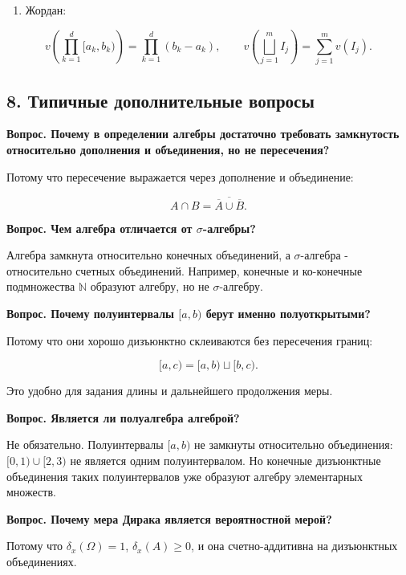 \documentclass[
  11pt,
  a4paper,
]{article}
\providecommand{\tightlist}{%
  \setlength{\itemsep}{0pt}\setlength{\parskip}{0pt}}
\begin{document}
\begin{enumerate}
\def\labelenumi{\arabic{enumi}.}
\setcounter{enumi}{4}
\tightlist
\item
  Жордан:
\end{enumerate}

\[
v\left(\prod_{k=1}^d[a_k,b_k)\right)=\prod_{k=1}^d(b_k-a_k),\qquad
v\left(\bigsqcup_{j=1}^m I_j\right)=\sum_{j=1}^m v(I_j).
\]

\subsection{8. Типичные дополнительные
вопросы}\label{ux442ux438ux43fux438ux447ux43dux44bux435-ux434ux43eux43fux43eux43bux43dux438ux442ux435ux43bux44cux43dux44bux435-ux432ux43eux43fux440ux43eux441ux44b}

\textbf{Вопрос. Почему в определении алгебры достаточно требовать
замкнутость относительно дополнения и объединения, но не пересечения?}

Потому что пересечение выражается через дополнение и объединение:

\[
A\cap B=\overline{\overline{A}\cup \overline{B}}.
\]

\textbf{Вопрос. Чем алгебра отличается от \(\sigma\)-алгебры?}

Алгебра замкнута относительно конечных объединений, а \(\sigma\)-алгебра
- относительно счетных объединений. Например, конечные и ко-конечные
подмножества \(\mathbb N\) образуют алгебру, но не \(\sigma\)-алгебру.

\textbf{Вопрос. Почему полуинтервалы \([a,b)\) берут именно
полуоткрытыми?}

Потому что они хорошо дизъюнктно склеиваются без пересечения границ:

\[
[a,c)=[a,b)\sqcup[b,c).
\]

Это удобно для задания длины и дальнейшего продолжения меры.

\textbf{Вопрос. Является ли полуалгебра алгеброй?}

Не обязательно. Полуинтервалы \([a,b)\) не замкнуты относительно
объединения: \([0,1)\cup[2,3)\) не является одним полуинтервалом. Но
конечные дизъюнктные объединения таких полуинтервалов уже образуют
алгебру элементарных множеств.

\textbf{Вопрос. Почему мера Дирака является вероятностной мерой?}

Потому что \(\delta_x(\Omega)=1\), \(\delta_x(A)\ge0\), и она
счетно-аддитивна на дизъюнктных объединениях.
\end{document}
